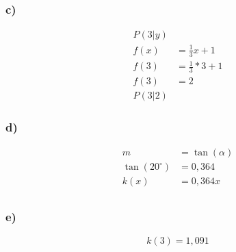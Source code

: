 \documentclass[a4paper, 10pt]{scrartcl}
\begin{document}
		\begin{minipage}{0.5\textwidth}
			\vspace*{10mm}
			\subsubsection*{c)}
				\begin{align*}
					\text{$P (3|y)$} \\
					f(x) &= \frac{1}{3}x + 1 \\
					f(3) &= \frac{1}{3} * 3 + 1 \\
					f(3) &= 2 \\
					\text{$P (3|2)$}
				\end{align*}
			\subsubsection*{d)}
			\begin{align*}
				m &= \tan(\alpha) \\
				\tan(20^{\circ}) &= 0,364\\
				k(x) &= 0,364x \\ 
			\end{align*}
			\subsubsection*{e)}
				\[k(3)= 1,091 \] \\
				\hspace*{10mm}
		\end{minipage}
\end{document}
